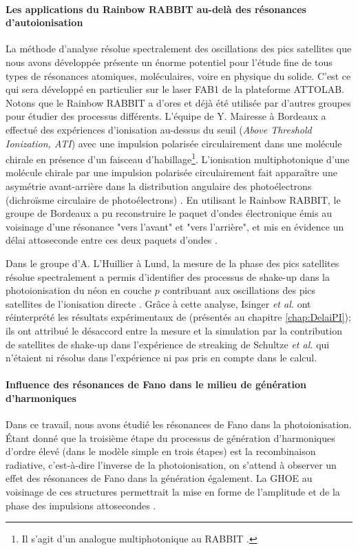 \paragraph*{Les applications du Rainbow RABBIT au-delà des résonances d'autoionisation} La méthode d'analyse résolue spectralement des oscillations des pics satellites que nous avons développée présente un énorme potentiel pour l'étude fine de tous types de résonances atomiques, moléculaires, voire en physique du solide. C'est ce qui sera développé en particulier sur le laser FAB1 de la plateforme ATTOLAB. Notons que le Rainbow RABBIT a d'ores et déjà été utilisée par d'autres groupes pour étudier des processus différents. L'équipe de Y. Mairesse à Bordeaux a effectué des expériences d'ionisation au-dessus du seuil (\textit{Above Threshold Ionization, ATI}) avec une impulsion polarisée circulairement dans une molécule chirale en présence d'un faisceau d'habillage\footnote{Il s'agit d'un analogue multiphotonique au RABBIT .}. L'ionisation multiphotonique d'une molécule chirale par une impulsion polarisée circulairement fait apparaître une asymétrie avant-arrière dans la distribution angulaire des photoélectrons (dichroïsme circulaire de photoélectrons) . En utilisant le Rainbow RABBIT, le groupe de Bordeaux a pu reconstruire le paquet d'ondes électronique émis au voisinage d'une résonance "vers l'avant" et "vers l'arrière", et mis en évidence un délai attoseconde entre ces deux paquets d'ondes .

Dans le groupe d'A. L'Huillier à Lund, la mesure de la phase des pics satellites résolue spectralement a permis d'identifier des processus de shake-up dans la photoionisation du néon en couche $p$ contribuant aux oscillations des pics satellites de l'ionisation directe . Grâce à cette analyse, Isinger \textit{et al.} ont réinterprété les résultats expérimentaux de  (présentés au chapitre \ref{chap:DelaiPI}); ils ont attribué le désaccord entre la mesure et la simulation par la contribution de satellites de shake-up dans l'expérience de streaking de Schultze \textit{et al.} qui n'étaient ni résolus dans l'expérience ni pas pris en compte dans le calcul.

\paragraph*{Influence des résonances de Fano dans le milieu de génération d'harmoniques} Dans ce travail, nous avons étudié les résonances de Fano dans la photoionisation. \'{E}tant donné que la troisième étape du processus de génération d'harmoniques d'ordre élevé (dans le modèle simple en trois étapes) est la recombinaison radiative, c'est-à-dire l'inverse de la photoionisation, on s'attend à observer un effet des résonances de Fano dans la génération également. La GHOE au voisinage de ces structures permettrait la mise en forme de l'amplitude et de la phase des impulsions attosecondes .

